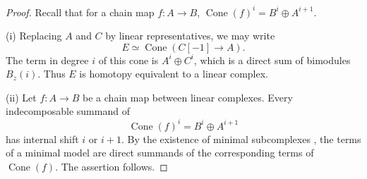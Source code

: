 \documentclass[11pt,a4paper]{article}
\numberwithin{equation}{section}
\theoremstyle{remark}
\begin{document}
\begin{proof}
	Recall that for a chain map $f:A\to B$,
	\(
	\operatorname{Cone}(f)^i=B^i\oplus A^{i+1}.
	\)
	
	(i) Replacing $A$ and $C$ by linear representatives,
	we may write
	\[
	E\simeq\operatorname{Cone}(C[-1]\to A).
	\]
	The term in degree $i$ of this cone is
	$A^i\oplus C^i$, which is a direct sum of
	bimodules $B_z(i)$. Thus $E$ is homotopy
	equivalent to a linear complex.
	
	(ii) Let $f:A\to B$ be a chain map between
	linear complexes. Every indecomposable summand
	of
	\[
	\operatorname{Cone}(f)^i=B^i\oplus A^{i+1}
	\]
	has internal shift $i$ or $i+1$.
	By the existence of minimal subcomplexes
	\cite[\S 6.1]{EW}, the terms of a minimal model
	are direct summands of the corresponding terms
	of $\operatorname{Cone}(f)$.
	The assertion follows.
\end{proof}
\end{document}
